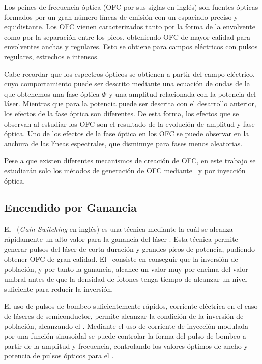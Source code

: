 Los peines de frecuencia \'optica (OFC por sus siglas en ingl\'es) son fuentes \'opticas formados por un gran n\'umero l\'ineas de emisi\'on con un espaciado preciso y equidistante. Los OFC vienen caracterizados tanto por la forma de la envolvente como por la separaci\'on entre los picos, obteniendo OFC de mayor calidad para envolventes anchas y regulares. Esto se obtiene para campos el\'ectricos con pulsos regulares, estrechos e intensos.

Cabe recordar que los espectros \'opticos se obtienen a partir del campo el\'ectrico, cuyo comportamiento puede ser descrito mediante una ecuaci\'on de ondas de la que obtenemos una fase \'optica $\Phi$ y una amplitud relacionada con la potencia del l\'aser. Mientras que para la potencia puede ser descrita con el desarrollo anterior, los efectos de la fase \'optica son diferentes. De esta forma, los efectos que se observan al estudiar los OFC son el resultado de la evolución de amplitud y fase óptica. Uno de los efectos de la fase \'optica en los OFC se puede observar en la anchura de las l\'ineas espectrales, que disminuye para fases menos aleatorias.

Pese a que existen diferentes mecanismos de creaci\'on de OFC, en este trabajo se estudiar\'an solo los m\'etodos de generaci\'on de OFC mediante \gs\ y por inyecci\'on \'optica.

	\subsection{Encendido por Ganancia}
		\label{Intr:OFC:GS}

		El \gs\ (\textit{Gain-Switching} en ingl\'es) es una t\'ecnica mediante la cu\'al se alcanza r\'apidamente un alto valor para la ganancia del l\'aser \cite{principles}. Esta t\'ecnica permite generar pulsos del l\'aser de corta duraci\'on y grandes picos de potencia, pudiendo obtener OFC de gran calidad. El \gs\ consiste en conseguir que la inversi\'on de poblaci\'on, y por tanto la ganancia, alcance un valor muy por encima del valor umbral antes de que la densidad de fotones tenga tiempo de alcanzar un nivel suficiente para reducir la inversi\'on. 
		
		El uso de pulsos de bombeo suficientemente r\'apidos, corriente eléctrica en el caso de láseres de semiconductor, permite alcanzar la condici\'on de la inversi\'on de poblaci\'on, alcanzando el \gs. Mediante el uso de corriente de inyecci\'on modulada por una funci\'on sinusoidal se puede controlar la forma del pulso de bombeo a partir de la amplitud y frecuencia, controlando los valores \'optimos de ancho y potencia de pulsos ópticos para el \gs.

